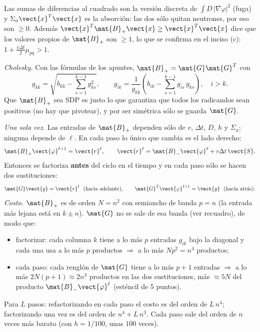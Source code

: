 \begin{porque}
Las sumas de diferencias al cuadrado son la versión discreta de $\int D\,|\nabla\varphi|^2$ (fuga) y
$\Sigma_a\vect{x}^T\vect{x}$ es la absorción: las dos sólo quitan neutrones, por eso son $\ge 0$. Además
$\vect{x}^T\mat{B}_+\vect{x}\ge\vect{x}^T\vect{x}$ dice que los valores propios de $\mat{B}_+$ son $\ge 1$, lo que se
confirma en el inciso (c): $1 + \frac{v\Delta t}{2}\mu_{pq} > 1$.
\end{porque}

\emph{Cholesky.} Con las fórmulas de los apuntes, $\mat{B}_+ = \mat{G}\mat{G}^T$ con
\[
  g_{kk} = \sqrt{b_{kk} - \sum_{s=1}^{k-1} g_{ks}^2}, \qquad
  g_{ik} = \frac{1}{g_{kk}}\left(b_{ik} - \sum_{s=1}^{k-1} g_{is}\,g_{ks}\right),\quad i > k .
\]
Que $\mat{B}_+$ sea SDP es justo lo que garantiza que todos los radicandos sean positivos (no hay que
pivotear), y por ser simétrica sólo se guarda $\mat{G}$.

\emph{Una sola vez.} Las entradas de $\mat{B}_+$ dependen sólo de $v$, $\Delta t$, $D$, $h$ y $\Sigma_a$; ninguna
depende de $\ell$. En cada paso lo único que cambia es el lado derecho:
\[
  \mat{B}_{+}\vect{\varphi}^{\ell+1} = \vect{r}^\ell, \qquad \vect{r}^\ell = \mat{B}_{-}\vect{\varphi}^\ell + v\Delta t\,\vect{S}.
\]
Entonces se factoriza \textbf{antes} del ciclo en el tiempo y en cada paso sólo se hacen dos sustituciones:
\[
  \mat{G}\vect{y} = \vect{r}^\ell\ \ (\text{hacia adelante}), \qquad
  \mat{G}^T\vect{\varphi}^{\ell+1} = \vect{y}\ \ (\text{hacia atrás}).
\]
\emph{Costo.} $\mat{B}_+$ es de orden $N = n^2$ con semiancho de banda $p = n$ (la entrada más lejana está en
$k\pm n$). $\mat{G}$ no se sale de esa banda (ver recuadro), de modo que:
\begin{itemize}
  \item factorizar: cada columna $k$ tiene a lo más $p$ entradas $g_{ik}$ bajo la diagonal y cada una usa a lo
        más $p$ productos $\Rightarrow$ a lo más $N p^2 = n^4$ productos;
  \item cada paso: cada renglón de $\mat{G}$ tiene a lo más $p + 1$ entradas $\Rightarrow$ a lo más
        $2N(p+1)\approx 2n^3$ productos en las dos sustituciones, más $\approx 5N$ del producto $\mat{B}_-\vect{\varphi}^\ell$
        (esténcil de 5 puntos).
\end{itemize}
Para $L$ pasos: refactorizando en cada paso el costo es del orden de $L\,n^4$; factorizando una vez es del
orden de $n^4 + L\,n^3$. Cada paso sale del orden de $n$ veces más barato (con $h = 1/100$, unas $100$ veces).


